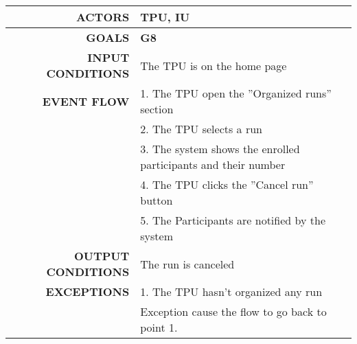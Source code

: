 \begin{table}[h!]
\begin{tabular}{|r|p{3in}|}
\hline
\textbf{ACTORS} & TPU, IU\\
\hline
\textbf{GOALS} & \textbf{G8}\\
\hline
\textbf{INPUT CONDITIONS} & The TPU is on the home page\\
\hline
\textbf{EVENT FLOW} 
&1. The TPU open the ''Organized runs'' section \\
&2. The TPU selects a run \\
&3. The system shows the enrolled participants and their number\\
&4. The TPU clicks the ''Cancel run'' button \\
&5. The Participants are notified by the system \\
\hline
\textbf{OUTPUT CONDITIONS} & The run is canceled \\
\hline
\textbf{EXCEPTIONS} 
&1. The TPU hasn't organized any run\\
&Exception cause the flow to go back to point 1.\\
\hline
\end{tabular}
\end{table}